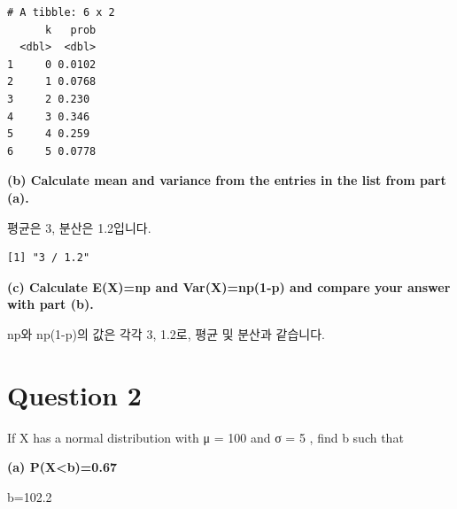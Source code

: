 \documentclass[
  letterpaper,
  DIV=11,
  numbers=noendperiod]{scrreprt}
\newenvironment{Shaded}{\begin{snugshade}}{\end{snugshade}}
\newcommand{\AttributeTok}[1]{\textcolor[rgb]{0.40,0.45,0.13}{#1}}
\newcommand{\DecValTok}[1]{\textcolor[rgb]{0.68,0.00,0.00}{#1}}
\newcommand{\FunctionTok}[1]{\textcolor[rgb]{0.28,0.35,0.67}{#1}}
\newcommand{\NormalTok}[1]{\textcolor[rgb]{0.00,0.23,0.31}{#1}}
\newcommand{\OtherTok}[1]{\textcolor[rgb]{0.00,0.23,0.31}{#1}}
\newcommand{\SpecialCharTok}[1]{\textcolor[rgb]{0.37,0.37,0.37}{#1}}
\newcommand{\StringTok}[1]{\textcolor[rgb]{0.13,0.47,0.30}{#1}}
\begin{document}
\begin{verbatim}
# A tibble: 6 x 2
      k   prob
  <dbl>  <dbl>
1     0 0.0102
2     1 0.0768
3     2 0.230 
4     3 0.346 
5     4 0.259 
6     5 0.0778
\end{verbatim}

\textbf{(b) Calculate mean and variance from the entries in the list
from part (a).}

평균은 3, 분산은 1.2입니다.

\begin{Shaded}
\end{Shaded}

\begin{verbatim}
[1] "3 / 1.2"
\end{verbatim}

\textbf{(c) Calculate E(X)=np and Var(X)=np(1-p) and compare your answer
with part (b).}

np와 np(1-p)의 값은 각각 3, 1.2로, 평균 및 분산과 같습니다.

\section*{Question 2}\label{question-2-1}


If X has a normal distribution with μ = 100 and σ = 5 , find b such that

\textbf{(a) P(X\textless b)=0.67}

b=102.2
\end{document}
